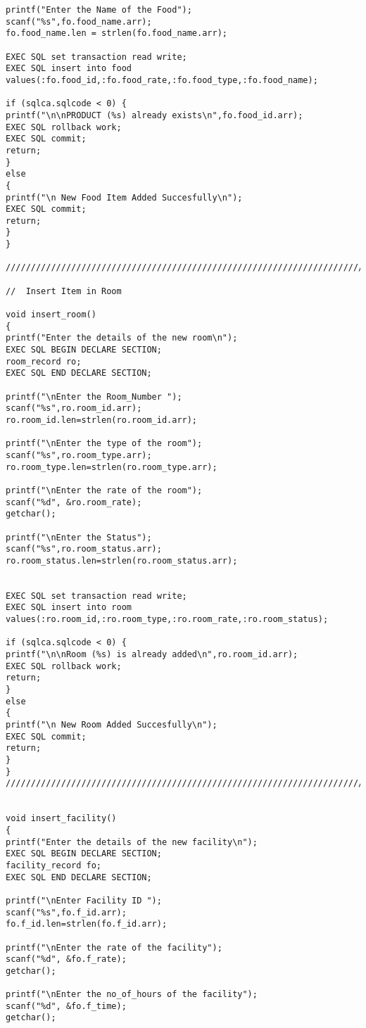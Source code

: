 \documentclass[a4,12pt]{report}
\begin{document}
\begin{lstlisting}
printf("Enter the Name of the Food");
scanf("%s",fo.food_name.arr);
fo.food_name.len = strlen(fo.food_name.arr);

EXEC SQL set transaction read write;
EXEC SQL insert into food values(:fo.food_id,:fo.food_rate,:fo.food_type,:fo.food_name);

if (sqlca.sqlcode < 0) {
printf("\n\nPRODUCT (%s) already exists\n",fo.food_id.arr);
EXEC SQL rollback work;
EXEC SQL commit;
return;
}
else
{
printf("\n New Food Item Added Succesfully\n");
EXEC SQL commit;
return;
}
}

////////////////////////////////////////////////////////////////////////////////////////////////////////////////////////////////////////////

//  Insert Item in Room

void insert_room()
{
printf("Enter the details of the new room\n");
EXEC SQL BEGIN DECLARE SECTION;
room_record ro;
EXEC SQL END DECLARE SECTION;

printf("\nEnter the Room_Number ");
scanf("%s",ro.room_id.arr);
ro.room_id.len=strlen(ro.room_id.arr);

printf("\nEnter the type of the room");
scanf("%s",ro.room_type.arr);
ro.room_type.len=strlen(ro.room_type.arr);

printf("\nEnter the rate of the room");
scanf("%d", &ro.room_rate);
getchar();

printf("\nEnter the Status");
scanf("%s",ro.room_status.arr);
ro.room_status.len=strlen(ro.room_status.arr);


EXEC SQL set transaction read write;
EXEC SQL insert into room values(:ro.room_id,:ro.room_type,:ro.room_rate,:ro.room_status);

if (sqlca.sqlcode < 0) {
printf("\n\nRoom (%s) is already added\n",ro.room_id.arr);
EXEC SQL rollback work;
return;
}
else 
{
printf("\n New Room Added Succesfully\n");
EXEC SQL commit;
return;
} 
}
////////////////////////////////////////////////////////////////////////////////////////////////////////////////////////////////////////


void insert_facility()
{
printf("Enter the details of the new facility\n");
EXEC SQL BEGIN DECLARE SECTION;
facility_record fo;
EXEC SQL END DECLARE SECTION;

printf("\nEnter Facility ID ");
scanf("%s",fo.f_id.arr);
fo.f_id.len=strlen(fo.f_id.arr);

printf("\nEnter the rate of the facility");
scanf("%d", &fo.f_rate);
getchar();

printf("\nEnter the no_of_hours of the facility");
scanf("%d", &fo.f_time);
getchar();


\end{lstlisting}
\end{document}
